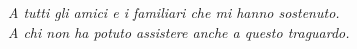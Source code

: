 \clearemptydoublepage{}
\thispagestyle{plain}
\null{}
\begin{flushright}
  \textit{%
    A tutti gli amici e i familiari che mi hanno sostenuto.\\
    A chi non ha potuto assistere anche a questo traguardo.
  }
\end{flushright}
\null{}
